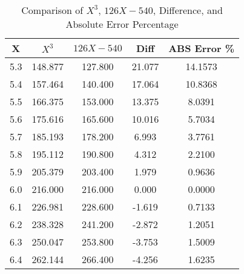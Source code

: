 ﻿%
\begin{table}[h!]
    \centering
    \caption{Comparison of $X^3$, $126X-540$, Difference, and Absolute Error Percentage}
    \begin{tabular}{|c|c|c|c|c|}
        \hline
        \textbf{X} & \textbf{$X^3$} & \textbf{$126X-540$} & \textbf{Diff} & \textbf{ABS Error \%} \\ \hline
        5.3        & 148.877        & 127.800             & 21.077        & 14.1573               \\ \hline
        5.4        & 157.464        & 140.400             & 17.064        & 10.8368               \\ \hline
        5.5        & 166.375        & 153.000             & 13.375        & 8.0391                \\ \hline
        5.6        & 175.616        & 165.600             & 10.016        & 5.7034                \\ \hline
        5.7        & 185.193        & 178.200             & 6.993         & 3.7761                \\ \hline
        5.8        & 195.112        & 190.800             & 4.312         & 2.2100                \\ \hline
        5.9        & 205.379        & 203.400             & 1.979         & 0.9636                \\ \hline
        6.0        & 216.000        & 216.000             & 0.000         & 0.0000                \\ \hline
        6.1        & 226.981        & 228.600             & -1.619        & 0.7133                \\ \hline
        6.2        & 238.328        & 241.200             & -2.872        & 1.2051                \\ \hline
        6.3        & 250.047        & 253.800             & -3.753        & 1.5009                \\ \hline
        6.4        & 262.144        & 266.400             & -4.256        & 1.6235                \\ \hline

\end{tabular}
\end{table}
